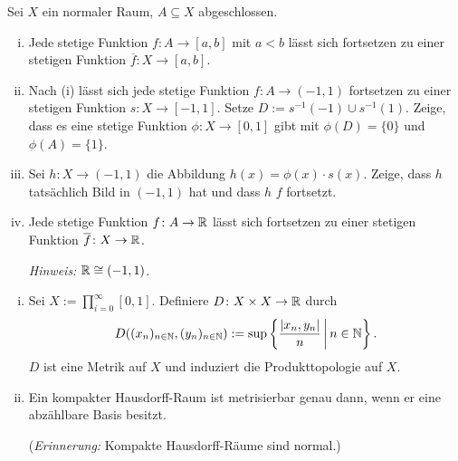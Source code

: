 \begin{aufgabe}
Sei $X$ ein normaler Raum, $A\subseteq X$ abgeschlossen. 
\begin{enumerate}[(i)]
\item Jede stetige Funktion $f\colon A\to [a,b]$ mit $a<b$ lässt sich fortsetzen zu einer stetigen Funktion $\overline{f}\colon X\to [a,b]$. 
\item Nach (i) lässt sich jede stetige Funktion $f\colon A\to (-1,1)$ fortsetzen zu einer stetigen Funktion $s\colon X\to [-1,1]$. Setze $D:= s^{-1}(-1) \cup s^{-1}(1)$. Zeige, dass es eine stetige Funktion $\phi\colon X\to [0,1]$ gibt mit $\phi(D)=\{0\}$ und $\phi(A)=\{1\}$.  
\item Sei $h\colon X\to (-1,1)$ die Abbildung $h(x)=\phi(x)\cdot s(x)$. Zeige, dass $h$ tatsächlich Bild in $(-1,1)$ hat und dass $h$ $f$ fortsetzt. 
\item Jede stetige Funktion $f\colon A\to \mathbb{R}$ lässt sich fortsetzen zu einer stetigen Funktion $\overline{f}\colon X\to \mathbb{R}$. 

\emph{Hinweis:} $\mathbb{R}\cong (-1,1)$. 
\end{enumerate}
\end{aufgabe}

\begin{aufgabe}
\begin{enumerate}[(i)] 
\item 
Sei $X:= \prod_{i=0}^\infty [0,1]$. Definiere $D\colon X\times X\to \mathbb{R}$ durch 
\[
D((x_n)_{n\in \mathbb{N}},(y_n)_{n\in \mathbb{N}}):=\sup\left\{\frac{\lvert x_n,y_n\rvert}{n}\,\middle\vert\,n\in \mathbb{N}\right\}.
\]
 $D$ ist eine Metrik auf $X$ und induziert die Produkttopologie auf $X$.
 \item Ein kompakter Hausdorff-Raum ist metrisierbar genau dann, wenn er eine abz\"ahlbare Basis besitzt. 
  
(\emph{Erinnerung:} Kompakte Hausdorff-R\"aume sind normal.)
\end{enumerate} 
\end{aufgabe}


